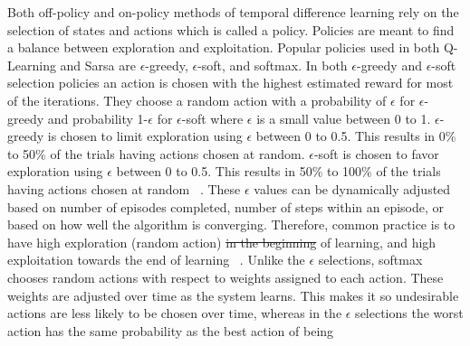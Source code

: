 \documentclass[12pt,american]{report}
\providecommand{\DIFaddtex}[1]{{\protect\color{blue}\uwave{#1}}} %
\providecommand{\DIFdeltex}[1]{{\protect\color{red}\sout{#1}}}                      %
\providecommand{\DIFaddbegin}{} %
\providecommand{\DIFaddend}{} %
\providecommand{\DIFdelbegin}{} %
\providecommand{\DIFdelend}{} %
\providecommand{\DIFadd}[1]{\texorpdfstring{\DIFaddtex{#1}}{#1}} %
\providecommand{\DIFdel}[1]{\texorpdfstring{\DIFdeltex{#1}}{}} %
\newcommand{\DIFscaledelfig}{0.5}
\newlength{\DIFdelgraphicswidth} %
\newlength{\DIFdelgraphicsheight} %
\newcommand{\DIFaddincludegraphics}[2][]{{\color{blue}\fbox{\DIFOincludegraphics[#1]{#2}}}} %
\newcommand{\DIFdelincludegraphics}[2][]{%
\sbox{\DIFdelgraphicsbox}{\DIFOincludegraphics[#1]{#2}}%
\settoboxwidth{\DIFdelgraphicswidth}{\DIFdelgraphicsbox} %
\settoboxtotalheight{\DIFdelgraphicsheight}{\DIFdelgraphicsbox} %
\scalebox{\DIFscaledelfig}{%
\parbox[b]{\DIFdelgraphicswidth}{\usebox{\DIFdelgraphicsbox}\\[-\baselineskip] \rule{\DIFdelgraphicswidth}{0em}}\llap{\resizebox{\DIFdelgraphicswidth}{\DIFdelgraphicsheight}{%
\setlength{\unitlength}{\DIFdelgraphicswidth}%
\begin{picture}(1,1)%
\thicklines\linethickness{2pt} %
{\color[rgb]{1,0,0}\put(0,0){\framebox(1,1){}}}%
{\color[rgb]{1,0,0}\put(0,0){\line( 1,1){1}}}%
{\color[rgb]{1,0,0}\put(0,1){\line(1,-1){1}}}%
\end{picture}%
}\hspace*{3pt}}} %
} %
\DeclareRobustCommand{\DIFaddbegin}{\DIFOaddbegin \let\includegraphics\DIFaddincludegraphics} %
\DeclareRobustCommand{\DIFaddend}{\DIFOaddend \let\includegraphics\DIFOincludegraphics} %
\DeclareRobustCommand{\DIFdelbegin}{\DIFOdelbegin \let\includegraphics\DIFdelincludegraphics} %
\DeclareRobustCommand{\DIFdelend}{\DIFOaddend \let\includegraphics\DIFOincludegraphics} %
\begin{document}
        \DIFaddend Both off-policy and on-policy methods of temporal difference learning rely on the selection of states and actions which is called a policy.  Policies are meant to find a balance between exploration and exploitation. Popular policies used in both Q-Learning and Sarsa are \begin{math}\epsilon\end{math}-greedy, \begin{math}\epsilon\end{math}-soft, and softmax.  In both \begin{math}\epsilon\end{math}-greedy and \begin{math}\epsilon\end{math}-soft selection policies an action is chosen with the highest estimated reward for most of the iterations. They choose a random action with a probability of \begin{math}\epsilon\end{math} for \begin{math}\epsilon\end{math}-greedy and probability 1-\begin{math}\epsilon\end{math} for \begin{math}\epsilon\end{math}-soft where \begin{math}\epsilon\end{math} is a small value between 0 to 1. \begin{math}\epsilon\end{math}-greedy is chosen to limit exploration using \begin{math}\epsilon\end{math} between 0 to 0.5. This results in 0\% to 50\% of the trials having actions chosen at random.  \begin{math}\epsilon\end{math}-soft is chosen to favor exploration using \begin{math}\epsilon\end{math} between 0 to 0.5. This results in 50\% to 100\% of the trials having actions chosen at random ~\cite{Eden}. These $\epsilon$ values can be dynamically adjusted based on number of episodes completed, number of steps within an episode, or based on how well the algorithm is converging.  Therefore, common practice is to have high exploration (random action) \DIFdelbegin \DIFdel{in the beginning }\DIFdelend \DIFaddbegin \DIFadd{at the start }\DIFaddend of learning, and high exploitation towards the end of learning ~\cite{Greedy}.  Unlike the \begin{math}\epsilon\end{math} selections, softmax chooses random actions with respect to weights assigned to each action. These weights are adjusted over time as the system learns. This makes it so undesirable actions are less likely to be chosen over time, whereas in the \begin{math}\epsilon\end{math} selections the worst action has the same probability as the best action of being 
\end{document}
